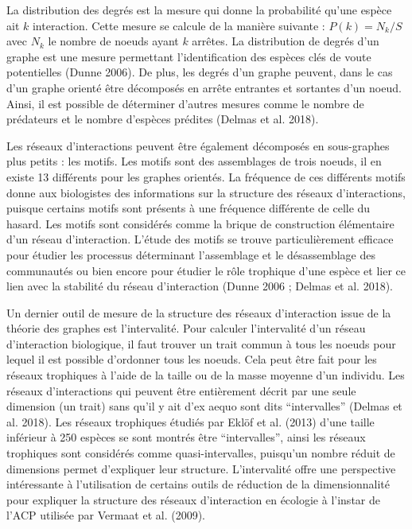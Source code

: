 \documentclass[
  12pt,
  a4paper,
  oneside]{report}
\begin{document}
La distribution des degrés est la mesure qui donne la probabilité qu'une
espèce ait \(k\) interaction. Cette mesure se calcule de la manière
suivante : \(P(k) = N_k / S\) avec \(N_k\) le nombre de noeuds ayant
\(k\) arrêtes. La distribution de degrés d'un graphe est une mesure
permettant l'identification des espèces clés de voute potentielles
(Dunne 2006). De plus, les degrés d'un graphe peuvent, dans le cas d'un
graphe orienté être décomposés en arrête entrantes et sortantes d'un
noeud. Ainsi, il est possible de déterminer d'autres mesures comme le
nombre de prédateurs et le nombre d'espèces prédites (Delmas et al.
2018).

Les réseaux d'interactions peuvent être également décomposés en
sous-graphes plus petits : les motifs. Les motifs sont des assemblages
de trois noeuds, il en existe 13 différents pour les graphes orientés.
La fréquence de ces différents motifs donne aux biologistes des
informations sur la structure des réseaux d'interactions, puisque
certains motifs sont présents à une fréquence différente de celle du
hasard. Les motifs sont considérés comme la brique de construction
élémentaire d'un réseau d'interaction. L'étude des motifs se trouve
particulièrement efficace pour étudier les processus déterminant
l'assemblage et le désassemblage des communautés ou bien encore pour
étudier le rôle trophique d'une espèce et lier ce lien avec la stabilité
du réseau d'interaction (Dunne 2006 ; Delmas et al. 2018).

Un dernier outil de mesure de la structure des réseaux d'interaction
issue de la théorie des graphes est l'intervalité. Pour calculer
l'intervalité d'un réseau d'interaction biologique, il faut trouver un
trait commun à tous les noeuds pour lequel il est possible d'ordonner
tous les noeuds. Cela peut être fait pour les réseaux trophiques à
l'aide de la taille ou de la masse moyenne d'un individu. Les réseaux
d'interactions qui peuvent être entièrement décrit par une seule
dimension (un trait) sans qu'il y ait d'ex aequo sont dits
``intervalles'' (Delmas et al. 2018). Les réseaux trophiques étudiés par
Eklöf et al. (2013) d'une taille inférieur à 250 espèces se sont montrés
être ``intervalles'', ainsi les réseaux trophiques sont considérés comme
quasi-intervalles, puisqu'un nombre réduit de dimensions permet
d'expliquer leur structure. L'intervalité offre une perspective
intéressante à l'utilisation de certains outils de réduction de la
dimensionnalité pour expliquer la structure des réseaux d'interaction en
écologie à l'instar de l'ACP utilisée par Vermaat et al. (2009).
\end{document}
